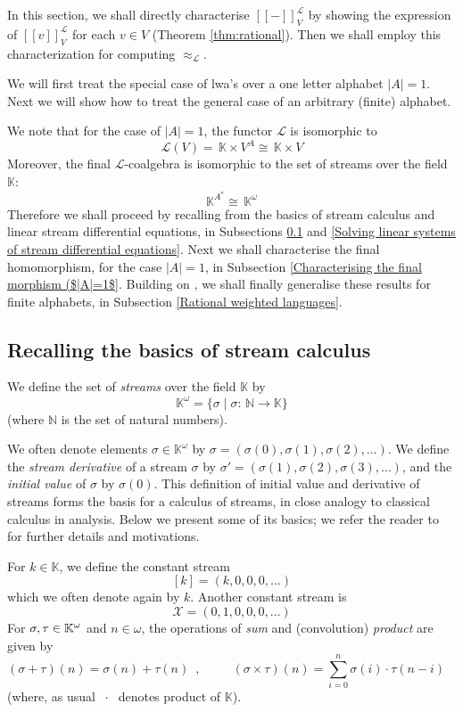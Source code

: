\documentclass[3p]{elsarticle}
\newcommand{\X}{\mathcal{X}}           %
\newcommand{\fL}{\mathcal{L}}    %
\newcommand{\vectproduct}{\times} %
\newcommand{\streamproduct}{\times} %
\newcommand{\beh}[3]{\left[\!\left[ #1 \right]\!\right]^{#2}_{#3}} %
\newcommand{\K}{\mathbb{K}}            %
\newcommand{\lwa}{{\sc lwa}}           %
\begin{document}
In this section, we shall directly characterise $\beh{-}{\fL}{V}$ by showing the expression of $\beh{v}{\fL}{V}$ for each $v\in V$ (Theorem \ref{thm:rational}).
Then we shall employ this characterization for computing $\approx_{\fL}$.

We will first treat the special case of \lwa's over a one letter
alphabet $|A|=1$.
Next we will show how to treat the
general case of an arbitrary (finite) alphabet.

We note that for the case of $|A|=1$, the functor
$\fL$ is isomorphic
to
\[
\fL (V) = \,  \K \vectproduct V^A \cong \, \K \vectproduct V
\]
Moreover, the final $\fL$-coalgebra is isomorphic to
the set of streams over the field $\K$:
\[
\K^{A^*} \cong \, \K^\omega
\]
Therefore we shall proceed by recalling
from \cite{Rutten2008:rational-streams-coalgebraically}
the basics of stream
calculus and linear stream differential equations,
in
Subsections \ref{Recalling the basics of stream calculus} and
\ref{Solving linear systems of stream differential equations}.
Next we shall characterise the final homomorphism,
for the case $|A|=1$,
in Subsection \ref{Characterising the final morphism ($|A|=1$}.
Building on \cite{Rutten2003-behavioural-differential-equations},
we shall finally generalise these results
for finite alphabets, in
Subsection \ref{Rational weighted languages}.

\subsection{Recalling the basics of stream calculus}
\label{Recalling the basics of stream calculus}

We define the set of {\em streams\/} over the  field $\K$ by
\[
\K^\omega = \{ \sigma \mid \sigma : \, \mathbb{N }\to \K \}
\]
(where $\mathbb{N }$ is the set of natural numbers).

We often denote elements $\sigma
\in \K^\omega$ by $\sigma = (\sigma(0), \sigma(1), \sigma(2),
\ldots)$. We define the {\em stream derivative\/} of a stream $\sigma$ by
$\sigma' = (\sigma(1), \sigma(2), \sigma(3), \ldots)$, and the {\em
initial value\/} of $\sigma$ by $\sigma(0)$. This definition of initial value and derivative of streams forms the basis
for a calculus of streams, in close analogy
to classical calculus in analysis. Below we present some of its basics; we refer
the reader to \cite{Rut05b} for further details and motivations.

For $k \in \K$, we define the constant stream
\[
[k] = (k,0,0,0, \ldots)
\]
which we often denote again by $k$. Another constant stream is
\[
\X= (0,1,0,0,0, \ldots)
\]
For $\sigma,\tau \in \K\sp{\omega}$ and $n \in \omega$, the
operations of \emph{sum} and (convolution) \emph{product} are given
by
\[
(\sigma + \tau)(n) = \sigma (n) + \tau(n)\enspace,
\;\;\;\;\;\;\;\;\; (\sigma \streamproduct \tau)(n) = \sum_{i=0}^{n}
\sigma (i) \cdot \tau(n-i) \;\;\;\;\;\;
\]
(where, as usual $\; \cdot \;$ denotes product of $\K$).
\end{document}

